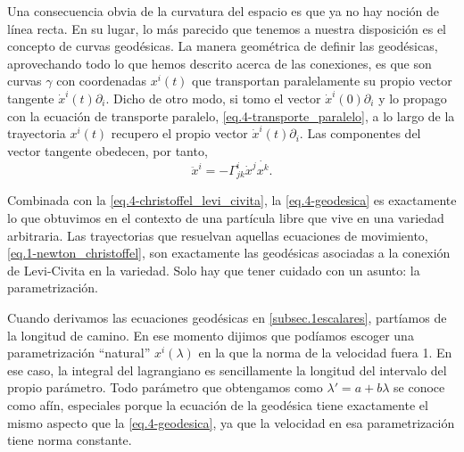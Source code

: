 Una consecuencia obvia de la curvatura del espacio es que ya no hay noción de línea recta. En su lugar, lo más parecido que tenemos a nuestra disposición es el concepto de curvas geodésicas. La manera geométrica de definir las geodésicas, aprovechando todo lo que hemos descrito acerca de las conexiones, es que son curvas \(\gamma\) con coordenadas \(x^i(t)\) que transportan paralelamente su propio vector tangente \(\dot{x}^i(t)\partial_i\). Dicho de otro modo, si tomo el vector \(\dot{x}^i(0)\partial_i\) y lo propago con la ecuación de transporte paralelo, \cref{eq.4-transporte_paralelo}, a lo largo de la trayectoria \(x^i(t)\) recupero el propio vector \(\dot{x}^i(t)\partial_i\). Las componentes del vector tangente obedecen, por tanto,
\begin{equation}
    \label{eq.4-geodesica}
    \ddot{x}^i = -\Gamma^{i}_{jk}\dot{x}^j\dot{x^k}.
\end{equation}

Combinada con la \cref{eq.4-christoffel_levi_civita}, la \cref{eq.4-geodesica} es exactamente lo que obtuvimos en el contexto de una partícula libre que vive en una variedad arbitraria. Las trayectorias que resuelvan aquellas ecuaciones de movimiento, \cref{eq.1-newton_christoffel}, son exactamente las geodésicas asociadas a la conexión de Levi-Civita en la variedad. Solo hay que tener cuidado con un asunto: la parametrización. 

Cuando derivamos las ecuaciones geodésicas en \cref{subsec.1escalares}, partíamos de la longitud de camino. En ese momento dijimos que podíamos escoger una parametrización ``natural'' \(x^i(\lambda)\) en la que la norma de la velocidad fuera 1. En ese caso, la integral del lagrangiano es sencillamente la longitud del intervalo del propio parámetro. Todo parámetro que obtengamos como \(\lambda' = a + b \lambda\) se conoce como afín, especiales porque la ecuación de la geodésica tiene exactamente el mismo aspecto que la \cref{eq.4-geodesica}, ya que la velocidad en esa parametrización tiene norma constante.

